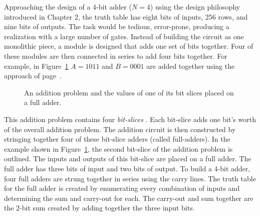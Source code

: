 Approaching the design of a 4-bit adder ($N=4$) using the design 
philosophy introduced in Chapter 2, the truth table has eight bits
of inputs, 256 rows, and nine bits of outputs.  The task would be tedious,
error-prone, producing a realization with a large number of 
gates.  Instead of building the circuit as one monolithic piece, a module 
is designed that adds one set of bits together.  Four of these modules are
then connected in series to add four bits together.
For example, in Figure~\ref{fig:comboBBadd} $A=1011$ and $B=0001$ are added
together using the approach of page~\pageref{page:addition}.

\begin{figure}[ht]
\caption{An addition problem and the values of one of its
bit slices placed on a full adder.}
\label{fig:comboBBadd}
\end{figure}

This addition problem contains four \textit{ bit-slices} .
Each bit-slice adds one bit's worth of the overall addition problem.  
The addition circuit is then constructed by stringing together four
of these bit-slice adders (called full-adders).  In the example shown
in Figure~\ref{fig:comboBBadd}, the second bit-slice of the addition problem 
is outlined.  The inputs and outputs of this bit-slice are placed on 
a full adder.  The full adder has three bits of input and two bits of output.
To build a 4-bit adder, four full adders are strung together in series
using the carry lines.  The truth table for the full adder is created 
by enumerating every combination of inputs and determining the sum and 
carry-out for each.  The carry-out and sum together are the 2-bit sum
created by adding together the three input bits.


